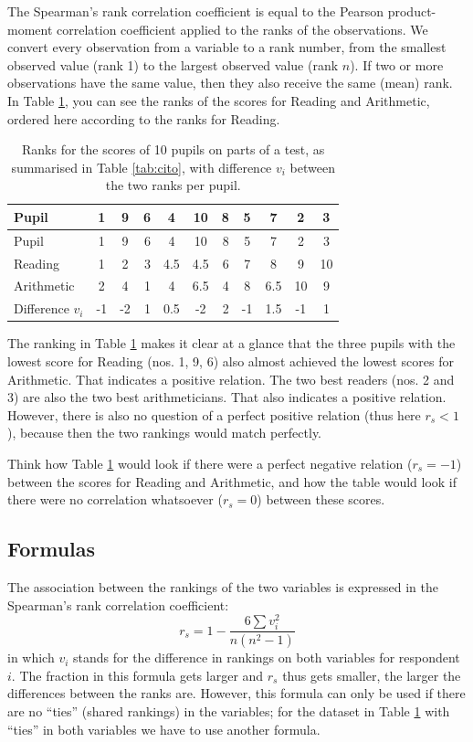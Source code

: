 \documentclass[
]{book}
\begin{document}
The Spearman's rank correlation coefficient is equal to the Pearson
product-moment correlation coefficient applied to the ranks of
the observations. We convert every observation from a variable to
a rank number, from the smallest observed value (rank 1)
to the largest observed value (rank \(n\)). If two or more observations
have the same value, then they also receive the same
(mean) rank. In
Table \ref{tab:cito-ranks}, you can see the ranks of the scores for Reading
and Arithmetic, ordered here according to the ranks for Reading.

\begin{longtable}[]{@{}lccrccrcccc@{}}
\caption{\label{tab:cito-ranks} Ranks for the scores of 10 pupils on parts of a test, as summarised in
Table \ref{tab:cito}, with difference \(v_i\) between the two ranks per pupil.}\tabularnewline
\toprule
Pupil & 1 & 9 & 6 & 4 & 10 & 8 & 5 & 7 & 2 & 3\tabularnewline
\midrule
\endfirsthead
\toprule
Pupil & 1 & 9 & 6 & 4 & 10 & 8 & 5 & 7 & 2 & 3\tabularnewline
\midrule
\endhead
Reading & 1 & 2 & 3 & 4.5 & 4.5 & 6 & 7 & 8 & 9 & 10\tabularnewline
Arithmetic & 2 & 4 & 1 & 4 & 6.5 & 4 & 8 & 6.5 & 10 & 9\tabularnewline
Difference \(v_i\) & -1 & -2 & 1 & 0.5 & -2 & 2 & -1 & 1.5 & -1 & 1\tabularnewline
\bottomrule
\end{longtable}

The ranking in Table \ref{tab:cito-ranks} makes it clear at a glance that
the three pupils with the lowest score for Reading (nos. 1, 9, 6) also almost achieved
the lowest scores for Arithmetic. That indicates a positive
relation. The two best readers (nos. 2 and 3) are also the two best
arithmeticians. That also indicates a positive relation. However, there is
also no question of a perfect positive relation (thus here \(r_s<1\)), because
then the two rankings would match perfectly.

Think how Table \ref{tab:cito-ranks} would look if there were a perfect
negative relation (\(r_s=-1\)) between the scores for Reading and
Arithmetic, and how the table would look if there were no correlation whatsoever
(\(r_s=0\)) between these scores.

\hypertarget{formulas-4}{%
\subsection{Formulas}\label{formulas-4}}

The association between the rankings of the two variables is expressed
in the Spearman's rank correlation coefficient:
\begin{equation}
    r_s = 1 - \frac{6 \sum v_i^2}{n(n^2-1)}
  \label{eq:spearman}
\end{equation}
in which \(v_i\) stands for
the difference in rankings on both variables for respondent \(i\). The fraction
in this formula gets larger and \(r_s\) thus gets smaller, the larger the
differences between the ranks are.
However, this formula can only be used if there are no ``ties'' (shared rankings) in the
variables; for the dataset in Table \ref{tab:cito-ranks} with ``ties'' in both variables
we have to use another formula.
\end{document}
